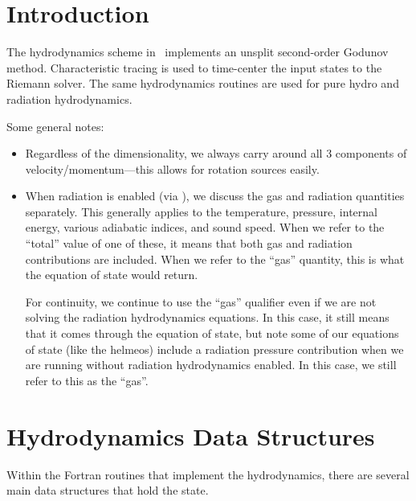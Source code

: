 \section{Introduction}

The hydrodynamics scheme in \castro\ implements an unsplit
second-order Godunov method.  Characteristic tracing is used to
time-center the input states to the Riemann solver.  The same
hydrodynamics routines are used for pure hydro and radiation
hydrodynamics.

Some general notes:
\begin{itemize}
\item Regardless of the dimensionality, we always carry around all 3
  components of velocity/momentum---this allows for rotation sources easily.

\item When radiation is enabled (via ), we discuss
  the gas and radiation quantities separately.  This generally applies
  to the temperature, pressure, internal energy, various adiabatic
  indices, and sound speed.  When we refer to the ``total'' value of
  one of these, it means that both gas and radiation contributions
  are included.  When we refer to the ``gas'' quantity, this is what
  the equation of state would return.

  For continuity, we continue to use the ``gas'' qualifier even if we
  are not solving the radiation hydrodynamics equations.  In this
  case, it still means that it comes through the equation of state,
  but note some of our equations of state (like the helmeos) include a
  radiation pressure contribution when we are running without
  radiation hydrodynamics enabled.  In this case, we still refer to
  this as the ``gas''.

\end{itemize}

\section{Hydrodynamics Data Structures}

Within the Fortran routines that implement the hydrodynamics, there are
several main data structures that hold the state.  

